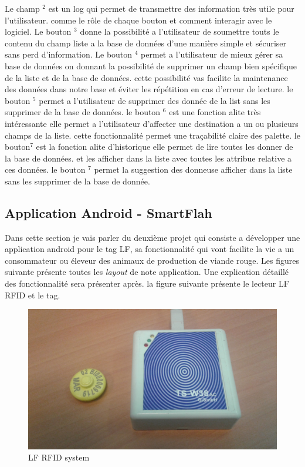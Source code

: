 \documentclass[11pt, a4paper, twoside]{book}
\begin{document}
Le champ \(^{2}\) est un log qui permet de transmettre des information très utile pour l'utilisateur. comme le rôle de chaque bouton et comment interagir avec le logiciel. Le bouton \(^{3}\) donne la possibilité a l'utilisateur de soumettre touts le contenu du champ liste a la base de données d'une manière simple et sécuriser sans perd d'information. Le bouton \(^{4}\) permet a l'utilisateur de mieux gérer sa base de données on donnant la possibilité de supprimer un champ bien spécifique de la liste et de la base de données. cette possibilité vas facilite la maintenance des données dans notre base et éviter les répétition en cas d'erreur de lecture. le bouton \(^{5}\) permet a l'utilisateur de supprimer des donnée de la list sans les supprimer de la base de données. le bouton \(^{6}\) est une fonction alite très intéressante elle permet a l'utilisateur d'affecter une destination a un ou plusieurs champs de la liste. cette fonctionnalité permet une traçabilité claire des palette. le bouton\(^{7}\) est la fonction alite d'historique elle permet de lire toutes les donner de la base de données. et les afficher dans la liste avec toutes les attribue relative a ces données.
le bouton \(^{7}\) permet la suggestion des donneuse afficher dans la liste sans les supprimer de la base de donnée.

\subsection{Application Android - SmartFlah}
Dans cette section je vais parler du deuxième projet qui consiste a développer une application android pour le tag LF, sa fonctionnalité qui vont facilite la vie a un consommateur ou éleveur des animaux de production de viande rouge. Les figures suivante présente toutes les \emph{layout} de note application. Une explication détaillé des fonctionnalité sera présenter après. la figure suivante présente le lecteur LF RFID et le tag.

\begin{figure}[H]
\centering
\includegraphics[width=\textwidth]{lfreader}
\caption{LF RFID system}
\end{figure}
\end{document}
